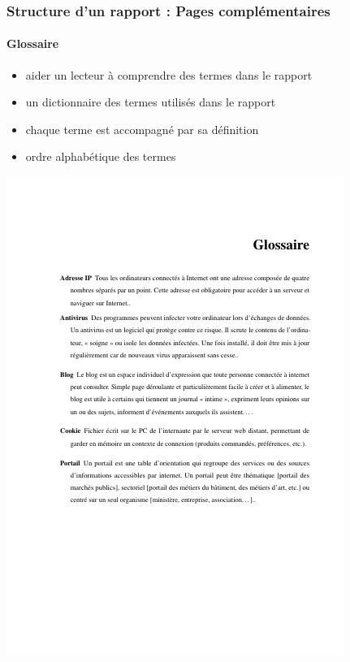 \documentclass[xcolor=table]{beamer}
\begin{document}
\begin{frame}
\frametitle{Structure d'un rapport : Pages complémentaires}
\framesubtitle{Glossaire}

\begin{minipage}{0.60\textwidth}
	\begin{itemize}
		\item aider un lecteur à comprendre des termes dans le rapport
		\item un dictionnaire des termes utilisés dans le rapport 
		\item chaque terme est accompagné par sa définition 
		\item ordre alphabétique des termes 
	\end{itemize}
\end{minipage}
\begin{minipage}{0.38\textwidth}
	\includegraphics[width=\textwidth,frame]{..//img/Bweb03-redaction/glossaire.png}
\end{minipage}

\end{frame}
\end{document}
